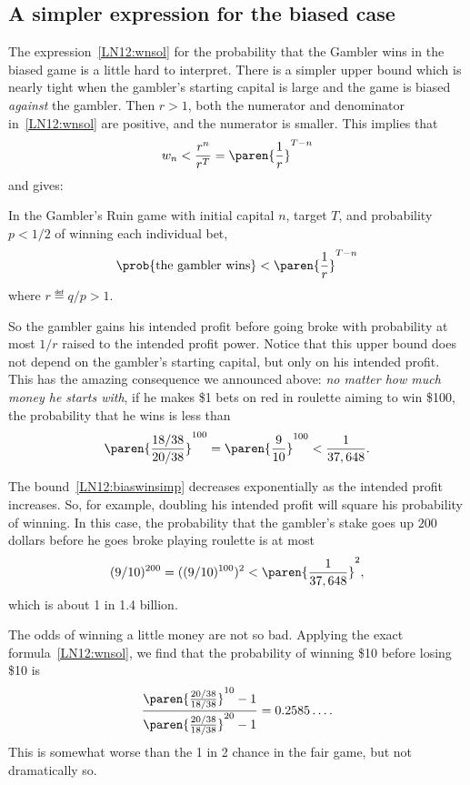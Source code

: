 \subsection{A simpler expression for the biased case}
The expression~\eqref{LN12:wnsol} for the probability that the Gambler
wins in the biased game is a little hard to interpret.  There is a
simpler upper bound which is nearly tight when the gambler's starting
capital is large and the game is biased \emph{against} the gambler.
Then $r >1$, both the numerator and denominator
in~\eqref{LN12:wnsol} are positive, and the numerator is smaller.
This implies that
\[
w_n < \frac{r^n}{r^T} = \paren{\frac{1}{r}}^{T-n}
\]
and gives:
\begin{corollary}\label{LN12:biaswincor}
  In the Gambler's Ruin game with initial capital $n$, target $T$,
  and probability $p < 1/2$ of winning each individual bet,
\begin{equation}\label{LN12:biaswinsimp}
\prob{\text{the gambler wins}} <  \paren{\frac{1}{r}}^{T-n} %
\end{equation}
where $r \eqdef q/p > 1$.
\end{corollary}

So the gambler gains his intended profit before going broke with
probability at most $1/r$ raised to the intended profit power.
Notice that this upper bound does not depend on the gambler's starting
capital, but only on his intended profit.  This has the amazing
consequence we announced above: \emph{no matter how much money he
  starts with}, if he makes \$1 bets on red in roulette aiming to win
\$100, the probability that he wins is less than
\[
\paren{\frac{18/38}{20/38}}^{100} = \paren{\frac{9}{10}}^{100} < \frac{1}{37,648}.
\]

The bound~\eqref{LN12:biaswinsimp} decreases exponentially as the
intended profit increases.  So, for example, doubling his intended
profit will square his probability of winning.  In this case, the
probability that the gambler's stake goes up $200$ dollars before he
goes broke playing roulette is at most
\[
(9/10)^{200} = ((9/10)^{100})^2 < \paren{\frac{1}{37,648}}^2,
\]
which is about 1 in 1.4 billion.

\begin{editingnotes}

The odds of winning a little money are not so bad.
Applying the exact formula~\eqref{LN12:wnsol}, we find that the probability
of winning \$10 before losing \$10 is
\[
\frac{\paren{\frac{20/38}{18/38}}^{10} - 1}
              {\paren{\frac{20/38}{18/38}}^{20} - 1}
  = 0.2585\dots.
\]
This is somewhat worse than the 1 in 2 chance in the fair game, but not
dramatically so.

\end{editingnotes}

